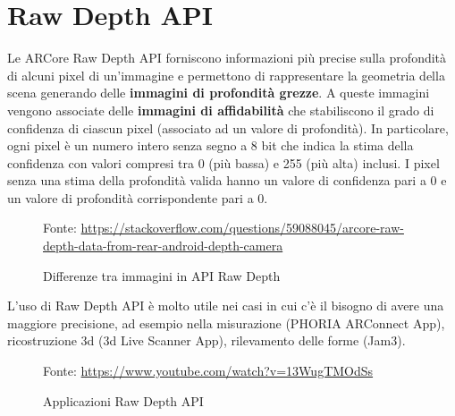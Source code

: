 \documentclass[crop=false, class=book]{standalone}
\begin{document}
		\section{Raw Depth API}
		Le ARCore Raw Depth API forniscono informazioni più precise sulla profondità di alcuni pixel di un'immagine e 					permettono di rappresentare la geometria della scena generando delle \textbf{immagini di profondità grezze}. A 					queste immagini vengono associate delle \textbf{immagini di affidabilità} che stabiliscono il grado di confidenza di 			ciascun pixel (associato ad un valore di profondità). In particolare, ogni pixel è un numero intero senza segno a 8 bit 		che indica la stima della confidenza con valori compresi tra 0 (più bassa) e 255 (più alta) inclusi. I pixel 					senza una stima della profondità valida hanno un valore di confidenza pari a 0 e un valore di profondità 						corrispondente pari a 0.
		
		\begin{figure}
				\centering
				{Fonte: \url{https://stackoverflow.com/questions/59088045/arcore-raw-depth-data-from-rear-android-depth-camera}}
				\caption{Differenze tra immagini in API Raw Depth }
				\label{fig: depth-raw-api}
		\end{figure}
		
		\begin{flushleft}
			L'uso di Raw Depth API è molto utile nei casi in cui c'è il bisogno di avere una maggiore precisione, ad esempio 				nella misurazione (PHORIA ARConnect App), ricostruzione 3d  (3d Live Scanner App), rilevamento delle forme (Jam3).
			
		\end{flushleft}
		
		\begin{figure}
				\centering
				{Fonte: \url{https://www.youtube.com/watch?v=13WugTMOdSs}}
				\caption{Applicazioni Raw Depth API }
				\label{fig: app-depth-raw-api}
		\end{figure}
\end{document}
